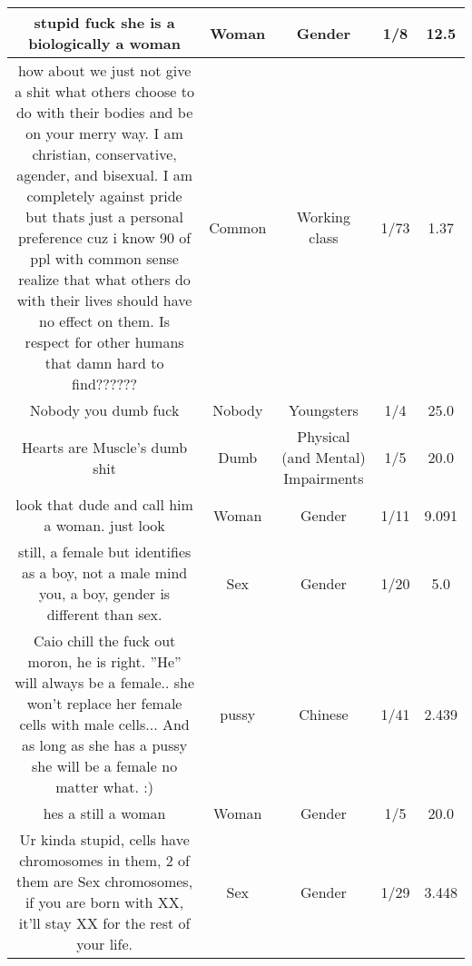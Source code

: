 \documentclass[11pt]{article}
\newlength\mylength
\begin{document}
\begin{center}
\begin{longtable}{|C{.40\mylength}|C{.30\mylength}|C{.15\mylength}|C{.15\mylength}|C{.15\mylength}|}
  stupid fuck she is a biologically a woman  & Woman & Gender & 1/8 & 12.5 \\  \hline
  how about we just not give a shit what others choose to do with their bodies and be on your merry way. I am christian, conservative, agender, and bisexual. I am completely against pride but thats just a personal preference cuz i know 90  of ppl with common sense realize that what others do with their lives should have no effect on them. Is respect for other humans that damn hard to find??????  & Common & Working class & 1/73 & 1.37 \\  \hline
  Nobody you dumb fuck  & Nobody & Youngsters & 1/4 & 25.0 \\  \hline
  Hearts are Muscle's dumb shit  & Dumb & Physical (and Mental) Impairments & 1/5 & 20.0 \\  \hline
  look   that dude and call him a woman. just look  & Woman & Gender & 1/11 & 9.091 \\  \hline
  still, a female but identifies as a boy, not a male mind you, a boy, gender is different than sex.  & Sex & Gender & 1/20 & 5.0 \\  \hline
  Caio chill the fuck out moron, he is right. ''He'' will always be a female.. she won't replace her female cells with male cells... And as long as she has a pussy she will be a female no matter what. :)  & pussy & Chinese & 1/41 & 2.439 \\  \hline
  hes a still a woman  & Woman & Gender & 1/5 & 20.0 \\  \hline
  Ur kinda stupid, cells have chromosomes in them, 2 of them are Sex chromosomes, if you are born with XX, it'll stay XX for the rest of your life.  & Sex & Gender & 1/29 & 3.448 \\  \hline

\end{longtable}
\end{center}
\end{document}
